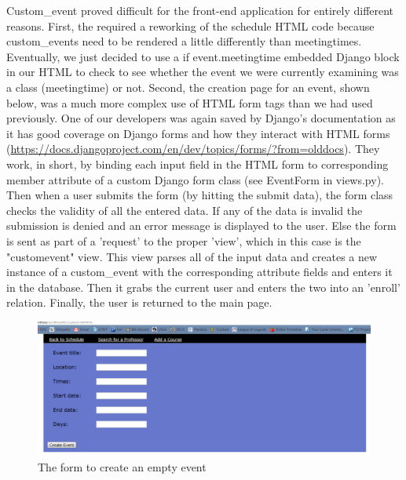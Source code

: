 \documentclass[pdftex,12pt,letter]{article}
\begin{document}
Custom\_event proved difficult for the front-end application for entirely different reasons. First, the required a reworking of the schedule HTML code because custom\_events need to be rendered a little differently than meetingtimes. Eventually, we just decided to use a {{ if event.meetingtime }} embedded Django block in our HTML to check to see whether the event we were currently examining was a class (meetingtime) or not. Second, the creation page for an event, shown below, was a much more complex use of HTML form tags than we had used previously. One of our developers was again saved by Django's documentation as it has good coverage on Django forms and how they interact with HTML forms (\url{https://docs.djangoproject.com/en/dev/topics/forms/?from=olddocs}). They work, in short, by binding each input field in the HTML form to corresponding member attribute of a custom Django form class (see EventForm in views.py). Then when a user submits the form (by hitting the submit data), the form class checks the validity of all the entered data. If any of the data is invalid the submission is denied and an error message is displayed to the user. Else the form is sent as part of a 'request' to the proper 'view', which in this case is the "customevent" view. This view parses all of the input data and creates a new instance of a custom\_event with the corresponding attribute fields and enters it in the database. Then it grabs the current user and enters the two into an 'enroll' relation. Finally, the user is returned to the main page.
\begin{figure}
\includegraphics[width=6in]{emptyEvent.png}
\caption{The form to create an empty event}
\end{figure}
\FloatBarrier
\end{document}

